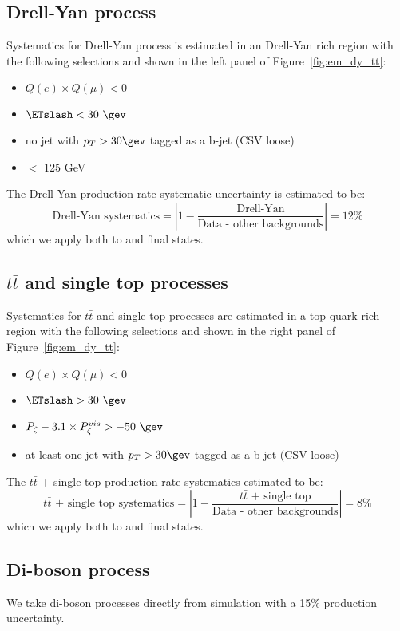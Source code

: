 \subsection{Drell-Yan process}\label{sec:em_DY}
Systematics for Drell-Yan process is estimated in an Drell-Yan rich 
region with the following selections and shown in the left panel of 
Figure~\ref{fig:em_dy_tt}:
\begin{itemize}
  \item $Q(e) \times Q(\mu) < 0$
  \item $\ETslash<30~\gev$
  \item no jet with $p_T>30\gev$ tagged as a b-jet (CSV loose)
  \item \meffemu $<$ 125 GeV
\end{itemize}
The Drell-Yan production rate systematic uncertainty is estimated to
be:
\begin{equation}\label{eq:DY}
\text{Drell-Yan systematics} = \left| 1 - \frac{\text{Drell-Yan}}{\text{Data - other backgrounds}}\right| = 12\%
\end{equation}
which we apply both to \tetm and \teth final states.

\subsection{$t\bar{t}$ and single top processes}\label{sec:em_tt}
Systematics for $t\bar{t}$ and single top processes are estimated in a
top quark rich region with the following selections and shown in the
right panel of Figure~\ref{fig:em_dy_tt}:
\begin{itemize}
  \item $Q(e) \times Q(\mu) < 0$
  \item $\ETslash>30~\gev$
  \item $P_{\zeta}- 3.1 \times P_{\zeta}^{vis} > -50~\gev$
  \item at least one jet with $p_T>30\gev$ tagged as a b-jet (CSV loose)
\end{itemize}
The $t\bar{t}$ + single top production rate systematics estimated to be:
\begin{equation}\label{eq:em_tt}
\text{$t\bar{t}$ + single top systematics} = \left| 1 - \frac{\text{$t\bar{t}$ + single top}}{\text{Data - other backgrounds}}\right| = 8\%
\end{equation}
which we apply both to \tetm and \teth final states.

\subsection{Di-boson process}
We take di-boson processes directly from simulation with a 15\% production uncertainty.


